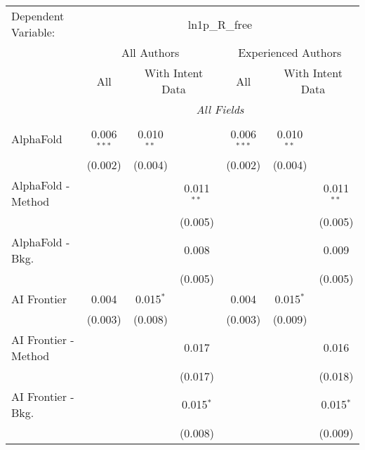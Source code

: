 \begingroup
\centering
\begin{tabular}{lcccccc}
   \tabularnewline \midrule \midrule
   Dependent Variable: & \multicolumn{6}{c}{ln1p\_R\_free}\\
 & \multicolumn{3}{c}{All Authors} & \multicolumn{3}{c}{Experienced Authors} \\
\cmidrule(lr){2-4} \cmidrule(lr){5-7}
 & \multicolumn{1}{c}{All} & \multicolumn{2}{c}{With Intent Data} & \multicolumn{1}{c}{All} & \multicolumn{2}{c}{With Intent Data} \\
\cmidrule(lr){2-2} \cmidrule(lr){3-4} \cmidrule(lr){5-5} \cmidrule(lr){6-7}
 & \multicolumn{6}{c}{\textit{All Fields}} \\ \\
   AlphaFold            & 0.006$^{***}$ & 0.010$^{**}$ &              & 0.006$^{***}$ & 0.010$^{**}$ &   \\   
                        & (0.002)       & (0.004)      &              & (0.002)       & (0.004)      &   \\   
   AlphaFold - Method   &               &              & 0.011$^{**}$ &               &              & 0.011$^{**}$\\   
                        &               &              & (0.005)      &               &              & (0.005)\\   
   AlphaFold - Bkg.     &               &              & 0.008        &               &              & 0.009\\   
                        &               &              & (0.005)      &               &              & (0.005)\\   
   AI Frontier          & 0.004         & 0.015$^{*}$  &              & 0.004         & 0.015$^{*}$  &   \\   
                        & (0.003)       & (0.008)      &              & (0.003)       & (0.009)      &   \\   
   AI Frontier - Method &               &              & 0.017        &               &              & 0.016\\   
                        &               &              & (0.017)      &               &              & (0.018)\\   
   AI Frontier - Bkg.   &               &              & 0.015$^{*}$  &               &              & 0.015$^{*}$\\   
                        &               &              & (0.008)      &               &              & (0.009)\\   

\end{tabular}
